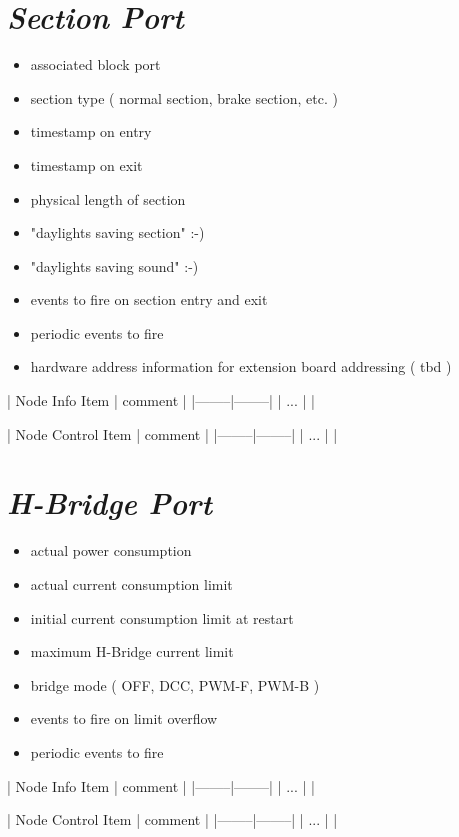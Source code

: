 \section{\textit{Section Port}}
\begin{itemize}
\begin{itemize}
\item associated block port
\item section type ( normal section, brake section, etc. )
\item timestamp on entry
\item timestamp on exit
\item physical length of section
\item "daylights saving section" :-)
\item "daylights saving sound" :-)
\item events to fire on section entry and exit
\item periodic events to fire
\item hardware address information for extension board addressing ( tbd )
\end{itemize}
\end{itemize}

| Node Info Item | comment |
|--------|--------|
| ... | |

| Node Control Item | comment |
|--------|--------|
| ... | |

\section{\textit{H-Bridge Port}}
\begin{itemize}
\begin{itemize}
\item actual power consumption
\item actual current consumption limit
\item initial current consumption limit at restart
\item maximum H-Bridge current limit
\item bridge mode ( OFF, DCC, PWM-F, PWM-B )
\item events to fire on limit overflow
\item periodic events to fire
\end{itemize}
\end{itemize}

| Node Info Item | comment |
|--------|--------|
| ... | |

| Node Control Item | comment |
|--------|--------|
| ... | |


